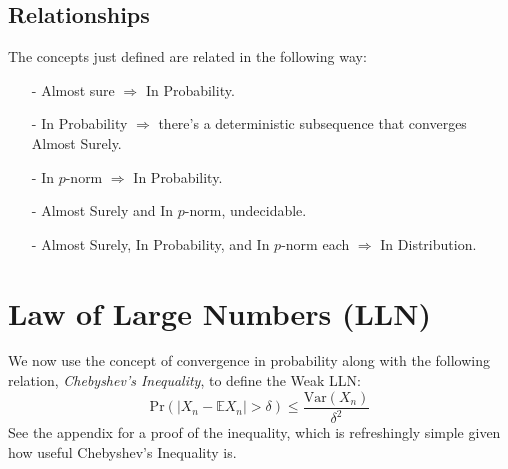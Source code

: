 \documentclass[a4paper,12pt]{scrartcl}
\begin{document}
%

\subsection{Relationships}

The concepts just defined are related in the following way:
\begin{itemize}
   \item[-]{Almost sure $\Rightarrow$ In Probability.}
   \item[-]{In Probability $\Rightarrow$ there's a deterministic 
      subsequence that converges Almost Surely.}
   \item[-]{In $p$-norm $\Rightarrow$ In Probability.}
   \item[-]{Almost Surely and In $p$-norm, undecidable.}
   \item[-]{Almost Surely, In Probability, and In $p$-norm each
      $\Rightarrow$ In Distribution.}
\end{itemize}

\newpage
\section{Law of Large Numbers (LLN)}

We now use the concept of convergence in probability 
along with the following relation, \emph{Chebyshev's Inequality},
to define the Weak LLN:
\begin{equation}
    \label{chebyshev}
    \text{Pr}\left(\left\lvert X_n - \mathbb{E}X_n \right\rvert > 
	\delta\right) \leq \frac{\text{Var}(X_n)}{\delta^2}
\end{equation}
See the appendix for
a proof of the inequality, which is refreshingly
simple given how useful Chebyshev's Inequality is.
\end{document}
